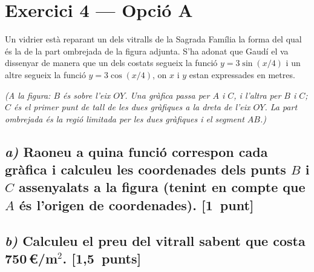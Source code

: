 \documentclass[11pt,a4paper]{article}
\begin{document}
\section*{\textcolor{blauPista}{Exercici 4 --- Opció A}}

\noindent Un vidrier està reparant un dels vitralls de la Sagrada Família la forma del qual és la de la part ombrejada de la figura adjunta. S'ha adonat que Gaudí el va dissenyar de manera que un dels costats segueix la funció $y = 3\sin(x/4)$ i un altre segueix la funció $y = 3\cos(x/4)$, on $x$ i $y$ estan expressades en metres.

\noindent\textit{(A la figura: $B$ és sobre l'eix $OY$. Una gràfica passa per $A$ i $C$, i l'altra per $B$ i $C$; $C$ és el primer punt de tall de les dues gràfiques a la dreta de l'eix $OY$. La part ombrejada és la regió limitada per les dues gràfiques i el segment $AB$.)}

\subsection*{\textit{a)} \normalfont Raoneu a quina funció correspon cada gràfica i calculeu les coordenades dels punts $B$ i $C$ assenyalats a la figura (tenint en compte que $A$ és l'origen de coordenades). \hspace*{\fill}\textnormal{[1~punt]}}


\subsection*{\textit{b)} \normalfont Calculeu el preu del vitrall sabent que costa 750\,\euro/m$^{2}$. \hspace*{\fill}\textnormal{[1,5~punts]}}
\end{document}
